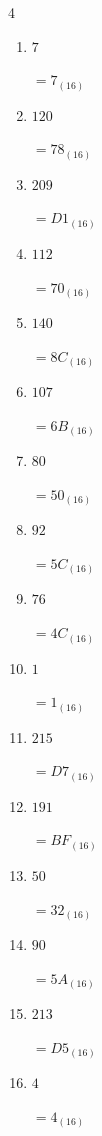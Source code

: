 \begin{multicols}{4}
\begin{enumerate}
        $=A5_{(16)}$

  \item $7$

        $=7_{(16)}$

  \item $120$

        $=78_{(16)}$

  \item $209$

        $=D1_{(16)}$

  \item $112$

        $=70_{(16)}$

  \item $140$

        $=8C_{(16)}$

  \item $107$

        $=6B_{(16)}$

\columnbreak %

  \item $80$

        $=50_{(16)}$

  \item $92$

        $=5C_{(16)}$

  \item $76$

        $=4C_{(16)}$

  \item $1$

        $=1_{(16)}$

  \item $215$

        $=D7_{(16)}$

  \item $191$

        $=BF_{(16)}$

  \item $50$

        $=32_{(16)}$

  \item $90$

        $=5A_{(16)}$

  \item $213$

        $=D5_{(16)}$

  \item $4$

        $=4_{(16)}$


\end{enumerate}
\end{multicols}
